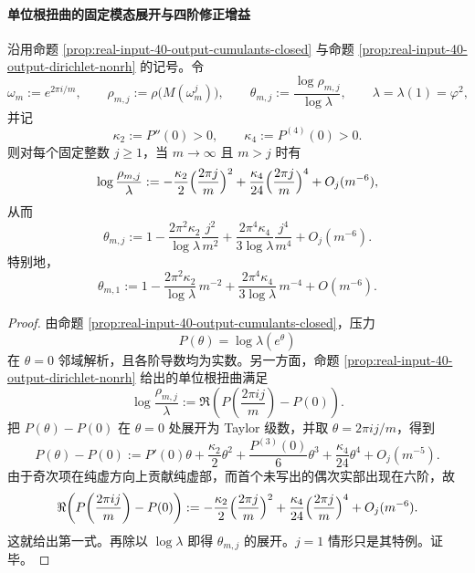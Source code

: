 \paragraph{单位根扭曲的固定模态展开与四阶修正增益}

\begin{theorem}[固定单位根模态误差指数的四阶展开]\label{thm:xi-output-potential-dirichlet-fixed-j-fourth-order}
沿用命题 \ref{prop:real-input-40-output-cumulants-closed} 与命题 \ref{prop:real-input-40-output-dirichlet-nonrh} 的记号。令
\[
\omega_m:=e^{2\pi i/m},
\qquad
\rho_{m,j}:=\rho\!\bigl(M(\omega_m^j)\bigr),
\qquad
\theta_{m,j}:=\frac{\log \rho_{m,j}}{\log \lambda},
\qquad
\lambda=\lambda(1)=\varphi^2,
\]
并记
\[
\kappa_2:=P''(0)>0,
\qquad
\kappa_4:=P^{(4)}(0)>0.
\]
则对每个固定整数 \(j\ge 1\)，当 \(m\to\infty\) 且 \(m>j\) 时有
\[
\log\frac{\rho_{m,j}}{\lambda}
:=
-\frac{\kappa_2}{2}\Bigl(\frac{2\pi j}{m}\Bigr)^2
+\frac{\kappa_4}{24}\Bigl(\frac{2\pi j}{m}\Bigr)^4
+O_j(m^{-6}),
\]
从而
\[
\boxed{\;
\theta_{m,j}
:=
1-\frac{2\pi^2\kappa_2}{\log\lambda}\frac{j^2}{m^2}
+\frac{2\pi^4\kappa_4}{3\log\lambda}\frac{j^4}{m^4}
+O_j(m^{-6}).\;}
\]
特别地，
\[
\boxed{\;
\theta_{m,1}
:=
1-\frac{2\pi^2\kappa_2}{\log\lambda}\,m^{-2}
+\frac{2\pi^4\kappa_4}{3\log\lambda}\,m^{-4}
+O(m^{-6}).\;}
\]
\end{theorem}
\begin{proof}
由命题 \ref{prop:real-input-40-output-cumulants-closed}，压力
\[
P(\theta)=\log \lambda(e^\theta)
\]
在 \(\theta=0\) 邻域解析，且各阶导数均为实数。另一方面，命题 \ref{prop:real-input-40-output-dirichlet-nonrh} 给出的单位根扭曲满足
\[
\log\frac{\rho_{m,j}}{\lambda}
:=
\Re\!\left(P\!\left(\frac{2\pi i j}{m}\right)-P(0)\right).
\]
把 \(P(\theta)-P(0)\) 在 \(\theta=0\) 处展开为 Taylor 级数，并取
\(
\theta=2\pi i j/m
\)，得到
\[
P(\theta)-P(0)
:=
P'(0)\theta+\frac{\kappa_2}{2}\theta^2+\frac{P^{(3)}(0)}{6}\theta^3
+\frac{\kappa_4}{24}\theta^4+O_j(m^{-5}).
\]
由于奇次项在纯虚方向上贡献纯虚部，而首个未写出的偶次实部出现在六阶，故
\[
\Re\!\left(P\!\left(\frac{2\pi i j}{m}\right)-P(0)\right)
:=
-\frac{\kappa_2}{2}\Bigl(\frac{2\pi j}{m}\Bigr)^2
+\frac{\kappa_4}{24}\Bigl(\frac{2\pi j}{m}\Bigr)^4
+O_j(m^{-6}).
\]
这就给出第一式。再除以 \(\log \lambda\) 即得 \(\theta_{m,j}\) 的展开。\(j=1\) 情形只是其特例。证毕。
\end{proof}

